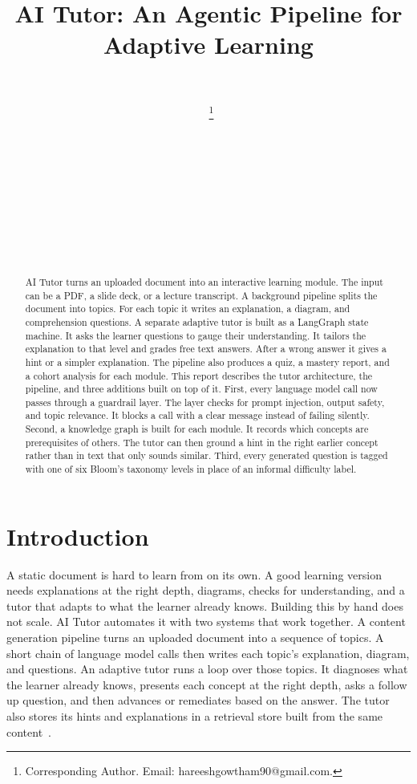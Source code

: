 \documentclass{ecai}
\begin{document}
\begin{frontmatter}


\title{AI Tutor: An Agentic Pipeline for Adaptive Learning}

\author[A]{~}
\author[A]{~\thanks{Corresponding Author. Email: hareeshgowtham90@gmail.com.}}
\author[A]{~}
\author[A]{~}
\author[A]{~}
\author[A]{~}
\author[A]{~}

\address[A]{Indian Institute of Science, Bengaluru}

\begin{abstract}
AI Tutor turns an uploaded document into an interactive learning module. The
input can be a PDF, a slide deck, or a lecture transcript. A background
pipeline splits the document into topics. For each topic it writes an
explanation, a diagram, and comprehension questions. A separate adaptive tutor
is built as a LangGraph state machine. It asks the learner questions to gauge
their understanding. It tailors the explanation to that level and grades free
text answers. After a wrong answer it gives a hint or a simpler explanation.
The pipeline also produces a quiz, a mastery report, and a cohort analysis for
each module. This report describes the tutor architecture, the pipeline, and
three additions built on top of it. First, every language model call now passes
through a guardrail layer. The layer checks for prompt injection, output
safety, and topic relevance. It blocks a call with a clear message instead of
failing silently. Second, a knowledge graph is built for each module. It records
which concepts are prerequisites of others. The tutor can then ground a hint in
the right earlier concept rather than in text that only sounds similar. Third,
every generated question is tagged with one of six Bloom's taxonomy levels in
place of an informal difficulty label.
\end{abstract}

\end{frontmatter}

\section{Introduction}

A static document is hard to learn from on its own. A good learning version
needs explanations at the right depth, diagrams, checks for understanding, and
a tutor that adapts to what the learner already knows. Building this by hand
does not scale. AI Tutor automates it with two systems that work together. A
content generation pipeline turns an uploaded document into a sequence of
topics. A short chain of language model calls then writes each topic's
explanation, diagram, and questions. An adaptive tutor runs a loop over those
topics. It diagnoses what the learner already knows, presents each concept at
the right depth, asks a follow up question, and then advances or remediates
based on the answer. The tutor also stores its hints and explanations in a
retrieval store built from the same content~\cite{lewis2020retrieval}.
\end{document}
